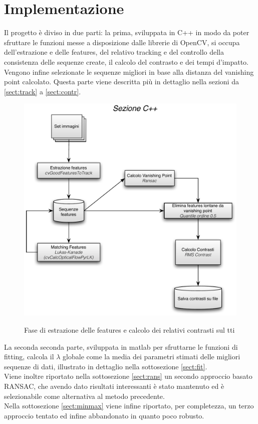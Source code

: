 \documentclass[12pt]{report}
\begin{document}
\chapter{Implementazione}

\noindent Il progetto \`e diviso in due parti: la prima, sviluppata in C++ in modo da poter sfruttare le funzioni messe a disposizione dalle librerie di OpenCV, si occupa dell'estrazione e delle features, del relativo tracking e del controllo della consistenza delle sequenze create, il calcolo del contrasto e dei tempi d'impatto. Vengono infine selezionate le sequenze migliori in base alla distanza del vanishing point calcolato. Questa parte viene descritta pi\`u in dettaglio nella sezioni da \ref{sect:track} a \ref{sect:contr}.\\

\begin{figure}[H]
	\centering
	\includegraphics[scale=0.7]{images/schemaCpp.pdf} 
	\label{diag:high}
	\caption{Fase di estrazione delle features e calcolo dei relativi contrasti sul tti}
\end{figure}

\noindent La seconda seconda parte, sviluppata in matlab per sfruttarne le funzioni di fitting, calcola il $\lambda$ globale come la media dei parametri stimati delle migliori sequenze di dati, illustrato in dettaglio nella sottosezione \ref{sect:fit}.\\
Viene inoltre riportato nella sottosezione \ref{sect:rans} un secondo approccio basato RANSAC, che avendo dato risultati interessanti \`e stato mantenuto ed \`e selezionabile come alternativa al metodo precedente.\\
Nella sottosezione \ref{sect:minmax} viene infine riportato, per completezza, un terzo approccio tentato ed infine abbandonato in quanto poco robusto.\\
\end{document}
